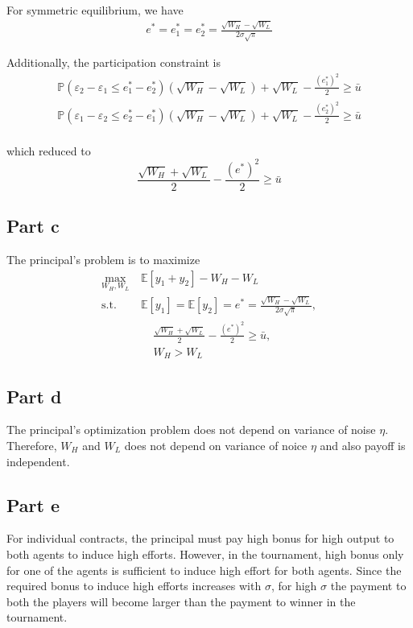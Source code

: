 For symmetric equilibrium, we have 
\begin{align*}
    e^* = e_1^* = e_2^* = \frac{\sqrt{ W_H} - \sqrt{ W_L}}{2\sigma \sqrt \pi}
\end{align*}

Additionally, the participation constraint is
\begin{align*}
    \mathbb P(\varepsilon_2 - \varepsilon_1 \le e^*_1 - e_2^*)(\sqrt{ W_H} - \sqrt{ W_L}) + \sqrt{ W_L} - \frac{(e^*_1)^2}{2} \ge \bar {u}\\
    \mathbb P(\varepsilon_1 - \varepsilon_2 \le e^*_2 - e_1^*)(\sqrt{ W_H} - \sqrt{ W_L}) + \sqrt{ W_L} - \frac{(e^*_2)^2}{2} \ge \bar {u}\\
\end{align*}

which reduced to
$$\frac{\sqrt{ W_H} + \sqrt{ W_L}}{2} - \frac{(e^*)^2}{2} \ge \bar u$$

\subsection*{Part c}

The principal's problem is to maximize
\begin{align*}
    \max_{W_H, W_L} & ~ \mathbb E[y_1 + y_2] - W_H - W_L \\
    \text{s.t.} & ~ \mathbb E[y_1] = \mathbb E[y_2] = e^* = \frac{\sqrt{ W_H} - \sqrt{ W_L}}{2\sigma \sqrt \pi},\\
    &~~~~~~ \frac{\sqrt{ W_H} + \sqrt{ W_L}}{2} - \frac{(e^*)^2}{2} \ge \bar u , \\
    &~~~~~~ W_H > W_L 
\end{align*}


\subsection*{Part d}
The principal's optimization problem does not depend on variance of noise $\eta$. Therefore, $W_H$ and $W_L$ does not depend on variance of noice $\eta$ and also payoff is independent.


\subsection*{Part e}
For individual contracts, the principal must pay high bonus for high output to both agents to induce high efforts. However, in the tournament, high bonus only for one of the agents is sufficient to induce high effort for both agents. Since the required bonus to induce high efforts increases with $\sigma$, for high $\sigma$ the payment to both the players will become larger than the payment to winner in the tournament.\\

